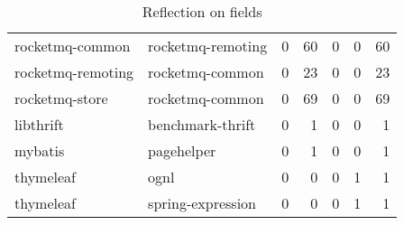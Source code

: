 \begin{table}[ht]
\begin{tabular}{ll!{\color{verylightgray}\vrule}rrrr!{\color{verylightgray}\vrule}r}
  rocketmq-common & rocketmq-remoting & 0 & 60 & 0 & 0 & 60 \\ 
  rocketmq-remoting & rocketmq-common & 0 & 23 & 0 & 0 & 23 \\ 
  rocketmq-store & rocketmq-common & 0 & 69 & 0 & 0 & 69 \\ 
  libthrift & benchmark-thrift & 0 & 1 & 0 & 0 & 1 \\ 
  mybatis & pagehelper & 0 & 1 & 0 & 0 & 1 \\ 
  thymeleaf & ognl & 0 & 0 & 0 & 1 & 1 \\ 
  thymeleaf & spring-expression & 0 & 0 & 0 & 1 & 1 \\ 
\end{tabular}
\endgroup
\caption{\label{tab:refl-fields}Reflection on fields} 
\end{table}
